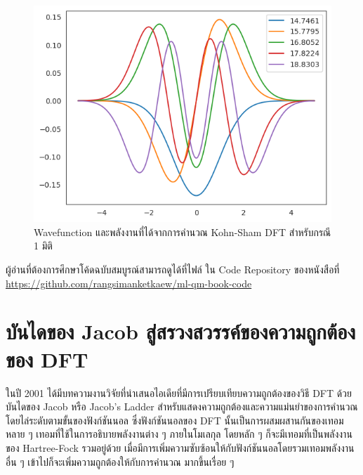 \begin{figure}[H]
    \centering
    \includegraphics[width=0.9\linewidth]{fig/ks_dft_1d_wfn_ener.png}
    \caption{Wavefunction และพลังงานที่ได้จากการคำนวณ Kohn-Sham DFT สำหรับกรณี 1 มิติ}
    \label{fig:ks_dft_1d_wfn_ener}
\end{figure}

ผู้อ่านที่ต้องการศึกษาโค้ดฉบับสมบูรณ์สามารถดูได้ที่ไฟล์  ใน Code Repository ของหนังสือที่ 
\url{https://github.com/rangsimanketkaew/ml-qm-book-code}

\section{บันไดของ Jacob สู่สรวงสวรรค์ของความถูกต้องของ DFT}
\label{sec:jacob_ladder}

ในปี 2001 ได้มีบทความงานวิจัยที่นำเสนอไอเดียที่มีการเปรียบเทียบความถูกต้องของวิธี DFT ด้วยบันไดของ Jacob หรือ Jacob's Ladder 
สำหรับแสดงความถูกต้องและความแม่นยำของการคำนวณโดยไล่ระดับตามขั้นของฟังก์ชันนอล\autocite{perdew2001} ซึ่งฟังก์ชันนอลของ DFT 
นั้นเป็นการผสมผสานกันของเทอมหลาย ๆ เทอมที่ใช้ในการอธิบายพลังงานต่าง ๆ ภายในโมเลกุล โดยหลัก ๆ ก็จะมีเทอมที่เป็นพลังงานของ 
Hartree-Fock รวมอยู่ด้วย เมื่อมีการเพิ่มความซับซ้อนให้กับฟังก์ชันนอลโดยรวมเทอมพลังงานอื่น ๆ เข้าไปก็จะเพิ่มความถูกต้องให้กับการคำนวณ%
มากขึ้นเรื่อย ๆ 

